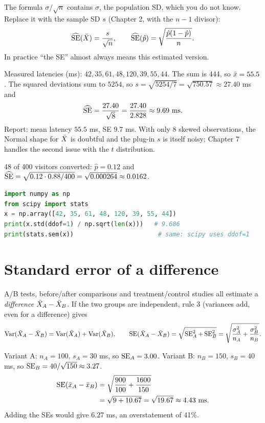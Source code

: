 The formula $\sigma/\sqrt n$ contains $\sigma$, the population SD, which you do not
know. Replace it with the sample SD $s$ (Chapter 2, with the $n-1$ divisor):
\[
\widehat{\operatorname{SE}}(\bar{X})=\frac{s}{\sqrt n},\qquad
\widehat{\operatorname{SE}}(\hat p)=\sqrt{\frac{\hat p(1-\hat p)}{n}} .
\]
In practice ``the SE'' almost always means this estimated version.

\begin{example}
Measured latencies (ms): $42, 35, 61, 48, 120, 39, 55, 44$. The sum is 444, so
$\bar{x}=55.5$. The squared deviations sum to $5254$, so
$s=\sqrt{5254/7}=\sqrt{750.57}\approx 27.40$ ms and
\[
\widehat{\operatorname{SE}}=\frac{27.40}{\sqrt 8}=\frac{27.40}{2.828}\approx 9.69\text{ ms}.
\]
Report: mean latency $55.5$ ms, SE $9.7$ ms. With only 8 skewed observations, the
Normal shape for $\bar{X}$ is doubtful and the plug-in $s$ is itself noisy;
Chapter 7 handles the second issue with the $t$ distribution.
\end{example}

\begin{example}
48 of 400 visitors converted: $\hat p=0.12$ and
$\widehat{\operatorname{SE}}=\sqrt{0.12\cdot 0.88/400}=\sqrt{0.000264}\approx 0.0162$.
\end{example}

\begin{lstlisting}[language=Python]
import numpy as np
from scipy import stats
x = np.array([42, 35, 61, 48, 120, 39, 55, 44])
print(x.std(ddof=1) / np.sqrt(len(x)))   # 9.686
print(stats.sem(x))                       # same: scipy uses ddof=1
\end{lstlisting}

\section{Standard error of a difference}
\label{sec:sd-diff}

A/B tests, before/after comparisons and treatment/control studies all estimate a
\emph{difference} $\bar{X}_A-\bar{X}_B$. If the two groups are independent, rule 3
(variances add, even for a difference) gives
\[
\operatorname{Var}(\bar{X}_A-\bar{X}_B)=\operatorname{Var}(\bar{X}_A)+\operatorname{Var}(\bar{X}_B),
\qquad
\operatorname{SE}(\bar{X}_A-\bar{X}_B)=\sqrt{\operatorname{SE}_A^2+\operatorname{SE}_B^2}=\sqrt{\frac{\sigma_A^2}{n_A}+\frac{\sigma_B^2}{n_B}} .
\]

\begin{example}
Variant A: $n_A=100$, $s_A=30$ ms, so $\operatorname{SE}_A=3.00$. Variant B: $n_B=150$, $s_B=40$
ms, so $\operatorname{SE}_B=40/\sqrt{150}\approx 3.27$.
\begin{align*}
\operatorname{SE}(\bar{x}_A-\bar{x}_B) &= \sqrt{\frac{900}{100}+\frac{1600}{150}} \\
&= \sqrt{9+10.67} = \sqrt{19.67} \approx 4.43\text{ ms}.
\end{align*}
Adding the SEs would give $6.27$ ms, an overstatement of 41\%.
\end{example}

